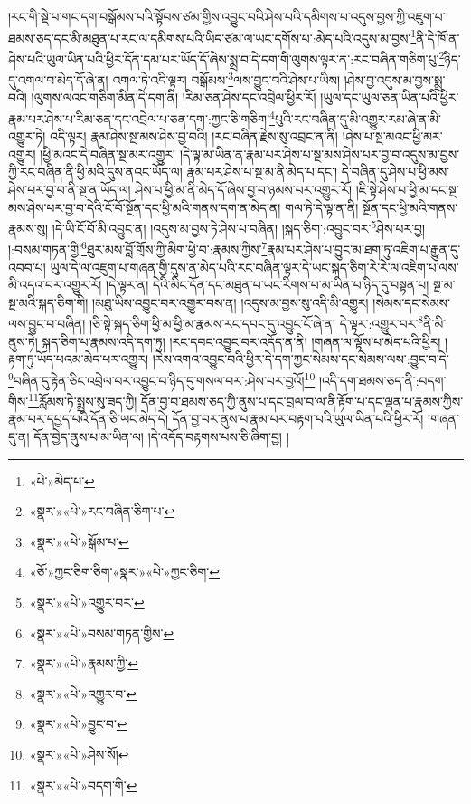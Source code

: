 །རང་གི་སྡེ་པ་གང་དག་བསྒོམས་པའི་སྟོབས་ཙམ་གྱིས་འབྱུང་བའི་ཤེས་པའི་དམིགས་པ་འདུས་བྱས་ཀྱི་འཇུག་པ་ཐམས་ཅད་དང་མི་མཐུན་པ་རང་ལ་དམིགས་པའི་ཡིད་ཙམ་ལ་ཡང་དགོས་པ་:མེད་པའི་འདུས་མ་བྱས་\footnote{«པེ་»མེད་པ་}ནི་དེ་ཁོ་ན་ཤེས་པའི་ཡུལ་ཡིན་པའི་ཕྱིར་དོན་དམ་པར་ཡོད་དོ་ཞེས་སྨྲ་བ་དེ་དག་གི་ལུགས་ལྟར་ན་:རང་བཞིན་གཅིག་པུ་\footnote{«སྣར་»«པེ་»རང་བཞིན་ཅིག་པ་}ཉིད་དུ་འགལ་བ་མེད་དོ་ཞེ་ན། འགལ་ཏེ་འདི་ལྟར། བསྒོམས་\footnote{«སྣར་»«པེ་»སྒོམ་པ་}ལས་བྱུང་བའི་ཤེས་པ་ཡིས། །ཤེས་བྱ་འདུས་མ་བྱས་སྨྲ་བའི། །ལུགས་ལའང་གཅིག་མིན་དེ་དག་ནི། །རིམ་ཅན་ཤེས་དང་འབྲེལ་ཕྱིར་རོ། །ཡུལ་དང་ཡུལ་ཅན་ཡིན་པའི་ཕྱིར་རྣམ་པར་ཤེས་པ་རིམ་ཅན་དང་འབྲེལ་པ་ཅན་དག་:ཀྱང་ཅི་གཅིག་\footnote{«ཅོ་»ཀྱང་ཅིག་ཅིག་«སྣར་»«པེ་»ཀྱང་ཅིག་}པུའི་རང་བཞིན་དུ་མི་འགྱུར་རམ་ཞེ་ན་མི་འགྱུར་ཏེ། འདི་ལྟར། རྣམ་ཤེས་སྔ་མས་ཤེས་བྱ་བའི། །རང་བཞིན་རྗེས་སུ་འབྲང་ན་ནི། །ཤེས་པ་སྔ་མའང་ཕྱི་མར་འགྱུར། །ཕྱི་མའང་དེ་བཞིན་སྔ་མར་འགྱུར། །དེ་ལྟ་མ་ཡིན་ན་རྣམ་པར་ཤེས་པ་སྔ་མས་ཤེས་པར་བྱ་བ་འདུས་མ་བྱས་ཀྱི་རང་བཞིན་ནི་ཕྱི་མའི་དུས་ནའང་ཡོད་ལ། རྣམ་པར་ཤེས་པ་སྔ་མ་ནི་མེད་པ་དང་། དེ་བཞིན་དུ་ཤེས་པ་ཕྱི་མས་ཤེས་པར་བྱ་བ་ནི་སྔ་ན་ཡོད་ལ། ཤེས་པ་ཕྱི་མ་ནི་མེད་དོ་ཞེས་བྱ་བ་ཉམས་པར་འགྱུར་རོ། །ཇི་སྟེ་ཤེས་པ་ཕྱི་མ་དང་སྔ་མས་ཤེས་པར་བྱ་བ་དེའི་ངོ་བོ་སྔོན་དང་ཕྱི་མའི་གནས་དག་ན་མེད་ན། གལ་ཏེ་དེ་ལྟ་ན་ནི། སྔོན་དང་ཕྱི་མའི་གནས་རྣམས་སུ། །དེ་ཡི་ངོ་བོ་མི་འབྱུང་ན། །འདུས་མ་བྱས་ཏེ་ཤེས་པ་བཞིན། །སྐད་ཅིག་:འབྱུང་བར་\footnote{«སྣར་»«པེ་»འགྱུར་བར་}ཤེས་པར་བྱ། །:བསམ་གཏན་གྱི་\footnote{«སྣར་»«པེ་»བསམ་གཏན་གྱིས་}ཐུར་མས་བློ་གྲོས་ཀྱི་མིག་ཕྱེ་བ་:རྣམས་ཀྱིས་\footnote{«སྣར་»«པེ་»རྣམས་ཀྱི་}རྣམ་པར་ཤེས་པ་བྱུང་མ་ཐག་ཏུ་འཇིག་པ་རྒྱུན་དུ་འབབ་པ། ཡུལ་དེ་ལ་འཇུག་པ་གཞན་གྱི་དུས་ན་མེད་པའི་རང་བཞིན་ལྟར་དེ་ཡང་སྐད་ཅིག་རེ་རེ་ལ་འཇིག་པ་ལས་མི་འདའ་བར་འགྱུར་རོ། །དེ་ལྟར་ན། དེའི་མིང་དོན་དང་མཐུན་པ་ཡང་རིགས་པ་མ་ཡིན་པ་ཉིད་དུ་བསྟན་པ། སྔ་མ་སྔ་མའི་སྐད་ཅིག་གི། །མཐུ་ཡིས་འབྱུང་བར་འགྱུར་བས་ན། །འདུས་མ་བྱས་སུ་འདི་མི་འགྱུར། །སེམས་དང་སེམས་ལས་བྱུང་བ་བཞིན། །ཅི་སྟེ་སྐད་ཅིག་ཕྱི་མ་ཕྱི་མ་རྣམས་རང་དབང་དུ་འབྱུང་ངོ་ཞེ་ན། དེ་ལྟར་:འགྱུར་བར་\footnote{«སྣར་»«པེ་»འགྱུར་བ་}ནི་མི་ནུས་ཏེ། སྐད་ཅིག་པ་རྣམས་འདི་དག་ཏུ། །རང་དབང་འབྱུང་བར་འདོད་ན་ནི། །གཞན་ལ་ལྟོས་པ་མེད་པའི་ཕྱིར། །རྟག་ཏུ་ཡོད་པའམ་མེད་པར་འགྱུར། །རེས་འགའ་འབྱུང་བའི་ཕྱིར་དེ་དག་ཀྱང་སེམས་དང་སེམས་ལས་:བྱུང་བ་དེ་\footnote{«སྣར་»«པེ་»བྱུང་བ་}བཞིན་དུ་རྟེན་ཅིང་འབྲེལ་བར་འབྱུང་བ་ཉིད་དུ་གསལ་བར་:ཤེས་པར་བྱའོ།\footnote{«སྣར་»«པེ་»ཤེས་སོ།} །འདི་དག་ཐམས་ཅད་ནི་:བདག་གིས་\footnote{«སྣར་»«པེ་»བདག་གི་}རློམས་ཏེ་སྨྲས་སུ་ཟད་ཀྱི། དོན་བྱ་བ་ཐམས་ཅད་ཀྱི་ནུས་པ་དང་བྲལ་བ་ལ་ནི་རྟོག་པ་དང་ལྡན་པ་རྣམས་ཀྱིས་རྣམ་པར་དཔྱད་པའི་དོན་ཅི་ཡང་མེད་དེ། དོན་བྱ་བར་ནུས་པ་རྣམ་པར་བརྟག་པའི་ཡུལ་ཡིན་པའི་ཕྱིར་རོ། །གཞན་དུ་ན། དོན་བྱེད་ནུས་པ་མ་ཡིན་ལ། །དེ་འདོད་བརྟགས་པས་ཅི་ཞིག་བྱ། །
